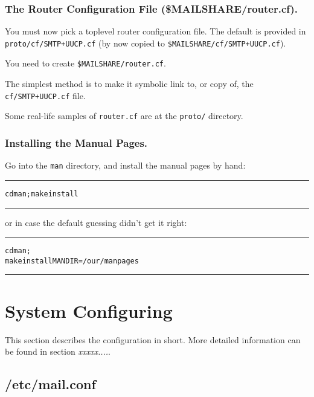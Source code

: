 \subsubsection{The Router Configuration File (\$MAILSHARE/router.cf).}%
%

You must now pick a toplevel router configuration file.  The
default is provided in {\tt proto/cf/SMTP+UUCP.cf} (by now copied to
{\tt \$MAILSHARE/cf/SMTP+UUCP.cf}).

You need to create {\tt \$MAILSHARE/router.cf}.

The simplest method is to make it symbolic link to, or copy of,
the {\tt cf/SMTP+UUCP.cf} file.

Some real-life samples of {\tt router.cf} are at the {\tt proto/} directory.


\subsubsection{Installing the Manual Pages.}%
%

Go into the {\tt man} directory, and install the manual pages by hand:
\nopagebreak
\begin{alltt}\medskip\hrule\medskip
  cd man ; make install
\medskip\hrule\end{alltt}\medskip

or in case the default guessing didn't get it right:
\nopagebreak
\begin{alltt}\medskip\hrule\medskip
  cd man ;
  make install MANDIR=/our/manpages
\medskip\hrule\end{alltt}\medskip


\section{System Configuring}%
%
%

This section describes the configuration in short. More detailed information 
can be found in section {\em xxxxx....\/}.


\subsection{/etc/mail.conf}%
%

